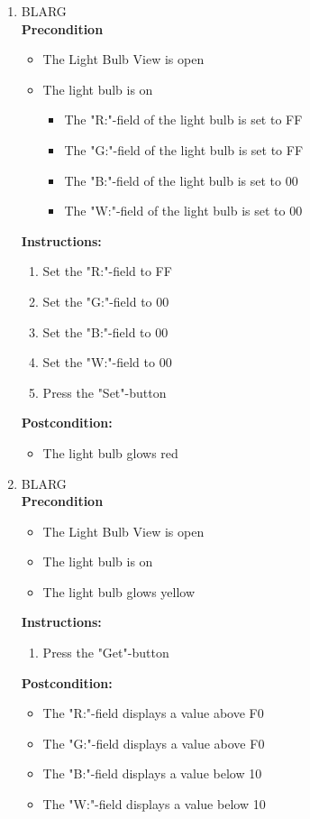 \documentclass[a4paper]{article}
\newlength{\testlabellength}
\newenvironment{testlist}{\begin{enumerate}[label=\bfseries Instruction \thesubsection.\arabic* , labelindent=0pt, labelwidth=\testlabellength , leftmargin=2cm]}{\end{enumerate}}
\newenvironment{precondition}{
{\color{white}BLARG}\\ 
\textbf{Precondition}
\begin{itemize}[labelindent=0cm, labelwidth=2cm , leftmargin=1cm]
}
{\end{itemize}}
\newenvironment{instruction}{
\textbf{Instructions:}
\begin{enumerate}[label=\bfseries  \arabic*., labelindent=0cm, labelwidth=2cm , leftmargin=1cm]
}
{\end{enumerate}}
\newenvironment{postcondition}{
\textbf{Postcondition:}
\begin{itemize}[labelindent=0cm, labelwidth=2cm , leftmargin=1cm]
}
{\end{itemize}}
\begin{document}
\begin{appendices}
\begin{testlist}
	\item
		\begin{precondition}
			\item The Light Bulb View is open
			\item The light bulb is on
			\begin{itemize}
				\item The "R:"-field of the light bulb is set to FF
				\item The "G:"-field of the light bulb is set to FF
				\item The "B:"-field of the light bulb is set to 00
				\item The "W:"-field of the light bulb is set to 00
			\end{itemize}
		\end{precondition}
		\begin{instruction}
			\item Set the "R:"-field to FF
			\item Set the "G:"-field to 00
			\item Set the "B:"-field to 00
			\item Set the "W:"-field to 00
			\item Press the "Set"-button
		\end{instruction}
		\begin{postcondition}
			\item The light bulb glows red
		\end{postcondition}

	\item
		\begin{precondition}
			\item The Light Bulb View is open
			\item The light bulb is on
			\item The light bulb glows yellow
		\end{precondition}
		\begin{instruction}
			\item Press the "Get"-button
		\end{instruction}
		\begin{postcondition}
			\item The "R:"-field displays a value above F0
			\item The "G:"-field displays a value above F0
			\item The "B:"-field displays a value below 10
			\item The "W:"-field displays a value below 10
		\end{postcondition}


\end{testlist}
\end{appendices}
\end{document}
